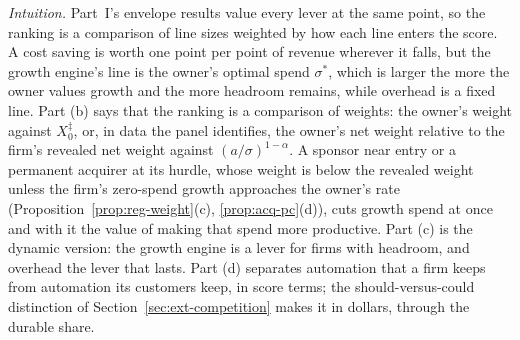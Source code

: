 \noindent\emph{Intuition.} Part~I's envelope results value every lever at the same point, so the ranking is a comparison of line sizes weighted by how each line enters the score. A cost saving is worth one point per point of revenue wherever it falls, but the growth engine's line is the owner's optimal spend $\sigma^*$, which is larger the more the owner values growth and the more headroom remains, while overhead is a fixed line. Part (b) says that the ranking is a comparison of weights: the owner's weight against $X^\ddagger_0$, or, in data the panel identifies, the owner's net weight relative to the firm's revealed net weight against $(a/\sigma)^{1-\alpha}$. A sponsor near entry or a permanent acquirer at its hurdle, whose weight is below the revealed weight unless the firm's zero-spend growth approaches the owner's rate (Proposition~\ref{prop:reg-weight}(c), \ref{prop:acq-pc}(d)), cuts growth spend at once and with it the value of making that spend more productive. Part (c) is the dynamic version: the growth engine is a lever for firms with headroom, and overhead the lever that lasts. Part (d) separates automation that a firm keeps from automation its customers keep, in score terms; the should-versus-could distinction of Section~\ref{sec:ext-competition} makes it in dollars, through the durable share.

